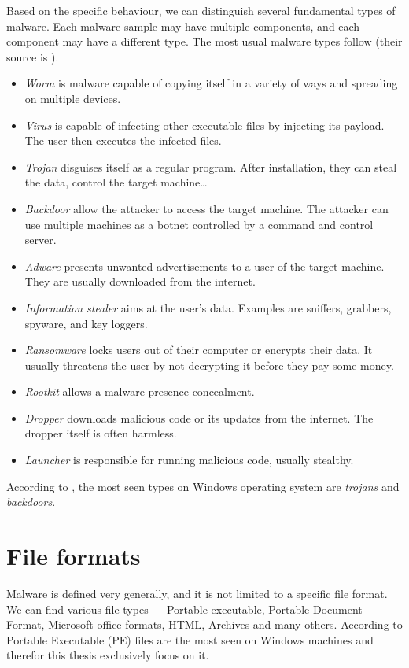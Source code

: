 Based on the specific behaviour, we can distinguish several fundamental types of malware. Each malware sample may have multiple components, and each component may have a different type. The most usual malware types follow (their source is \cite{Cole2009, KA2018, Graham2010, Sikorski2012}).
\begin{itemize}
  \itemsep0em 
  \item \emph{Worm} is malware capable of copying itself in a variety of ways and spreading on multiple devices.
  \item \emph{Virus} is capable of infecting other executable files by injecting its payload. The user then executes the infected files.
  \item \emph{Trojan} disguises itself as a regular program. After installation, they can steal the data, control the target machine\dots
  \item \emph{Backdoor} allow the attacker to access the target machine. The attacker can use multiple machines as a botnet controlled by a command and control server.
  \item \emph{Adware} presents unwanted advertisements to a user of the target machine. They are usually downloaded from the internet.
  \item \emph{Information stealer} aims at the user's data. Examples are sniffers, grabbers, spyware, and key loggers.
  \item \emph{Ransomware} locks users out of their computer or encrypts their data. It usually threatens the user by not decrypting it before they pay some money.
  \item \emph{Rootkit} allows a malware presence concealment.
  \item \emph{Dropper} downloads malicious code or its updates from the internet. The dropper itself is often harmless.
  \item \emph{Launcher} is responsible for running malicious code, usually stealthy.
\end{itemize}

According to \cite{AVATLASM39:online}, the most seen types on Windows operating system are \emph{trojans} and \emph{backdoors}.

\section{File formats}
Malware is defined very generally, and it is not limited to a specific file format. We can find various file types --- Portable executable, Portable Document Format, Microsoft office formats, HTML, Archives and many others. According to \cite{AVATLASM39:online} Portable Executable (PE) files are the most seen on Windows machines and therefor this thesis exclusively focus on it.

